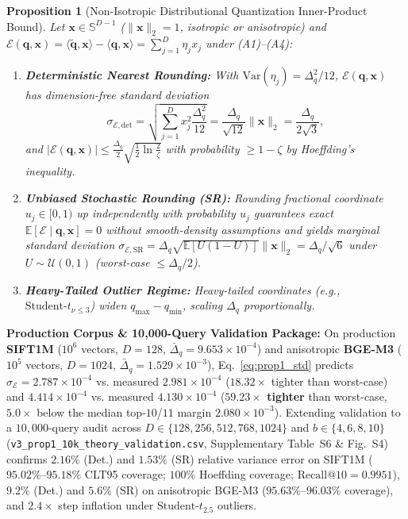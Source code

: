 \documentclass[10pt,journal,compsoc]{IEEEtran}
\newtheorem{proposition}{Proposition}
\begin{document}
\begin{proposition}[Non-Isotropic Distributional Quantization Inner-Product Bound]\label{prop:quant}
Let $\mathbf{x} \in \mathbb{S}^{D-1}$ ($\|\mathbf{x}\|_2=1$, isotropic or anisotropic) and $\mathcal{E}(\mathbf{q},\mathbf{x}) = \langle \tilde{\mathbf{q}},\mathbf{x}\rangle - \langle \mathbf{q},\mathbf{x}\rangle = \sum_{j=1}^D \eta_j x_j$ under (A1)--(A4):
\begin{enumerate}
    \item \textbf{Deterministic Nearest Rounding:} With $\mathrm{Var}(\eta_j)=\Delta_q^2/12$, $\mathcal{E}(\mathbf{q},\mathbf{x})$ has dimension-free standard deviation
    \begin{equation}
    \sigma_{\mathcal{E},\mathrm{det}} = \sqrt{\sum_{j=1}^D x_j^2 \frac{\Delta_q^2}{12}} = \frac{\Delta_q}{\sqrt{12}}\|\mathbf{x}\|_2 = \frac{\Delta_q}{2\sqrt{3}},
    \label{eq:prop1_std}
    \end{equation}
    and $|\mathcal{E}(\mathbf{q},\mathbf{x})| \le \frac{\Delta_q}{2}\sqrt{\frac{1}{2}\ln\frac{2}{\zeta}}$ with probability $\ge 1-\zeta$ by Hoeffding's inequality.
    \item \textbf{Unbiased Stochastic Rounding (SR):} Rounding fractional coordinate $u_j \in [0,1)$ up independently with probability $u_j$ guarantees exact $\mathbb{E}[\mathcal{E}\mid \mathbf{q},\mathbf{x}]=0$ without smooth-density assumptions and yields marginal standard deviation $\sigma_{\mathcal{E},\mathrm{SR}} = \Delta_q\sqrt{\mathbb{E}[U(1-U)]}\|\mathbf{x}\|_2 = \Delta_q / \sqrt{6}$ under $U \sim \mathcal{U}(0,1)$ (worst-case $\le \Delta_q / 2$).
    \item \textbf{Heavy-Tailed Outlier Regime:} Heavy-tailed coordinates (e.g., $\text{Student-}t_{\nu \le 3}$) widen $q_{\max}-q_{\min}$, scaling $\Delta_q$ proportionally.
\end{enumerate}
\end{proposition}

\textbf{Production Corpus \& 10,000-Query Validation Package:} On production \textbf{SIFT1M} ($10^6$ vectors, $D=128$, $\bar{\Delta}_q = 9.653\times 10^{-4}$) and anisotropic \textbf{BGE-M3} ($10^5$ vectors, $D=1024$, $\bar{\Delta}_q = 1.529\times 10^{-3}$), Eq.~\eqref{eq:prop1_std} predicts $\sigma_{\mathcal{E}} = 2.787\times 10^{-4}$ vs. measured $2.981\times 10^{-4}$ ($18.32\times$ tighter than worst-case) and $4.414\times 10^{-4}$ vs. measured $4.130\times 10^{-4}$ (\textbf{$59.23\times$ tighter} than worst-case, $5.0\times$ below the median top-$10$/$11$ margin $2.080\times 10^{-3}$). Extending validation to a $10,000$-query audit across $D \in \{128,256,512,768,1024\}$ and $b \in \{4,6,8,10\}$ (\texttt{v3\_prop1\_10k\_theory\_validation.csv}, Supplementary Table~S6 \& Fig.~S4) confirms $2.16\%$ (Det.) and $1.53\%$ (SR) relative variance error on SIFT1M ($95.02\%$--$95.18\%$ CLT95 coverage; $100\%$ Hoeffding coverage; $\text{Recall@10}=0.9951$), $9.2\%$ (Det.) and $5.6\%$ (SR) on anisotropic BGE-M3 ($95.63\%$--$96.03\%$ coverage), and $2.4\times$ step inflation under $\text{Student-}t_{2.5}$ outliers.
\end{document}
